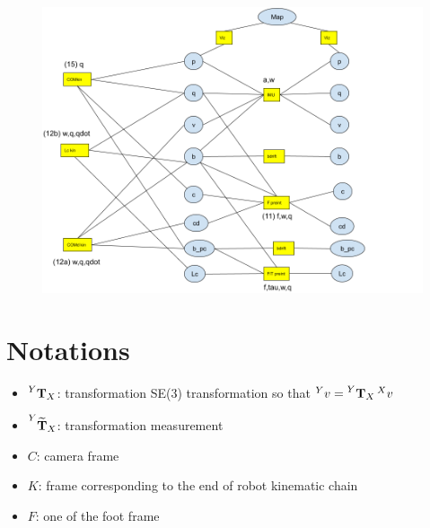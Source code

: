\documentclass[11pt]{article}
\newcommand{\T}[2]{\prescript{#1}{}{\bfT}_{#2}}
\newcommand{\Tm}[2]{\prescript{#1}{}{\widetilde{\bfT}}_{#2}}
\begin{document}
\begin{figure}[ht]
    \centering
    \includegraphics[width=1\linewidth]{HumanoidStateFactorGraph.png}
    \label{fig:my_label}
\end{figure}





\section{Notations}
\begin{itemize}
    \item $\T{Y}{X}$: transformation SE(3) transformation so that $\prescript{Y}{}{v}=\T{Y}{X}\prescript{X}{}{v}$
    \item $\Tm{Y}{X}$: transformation measurement
    \item $C$: camera frame
    \item $K$: frame corresponding to the end of robot kinematic chain 
    \item $F$: one of the foot frame 
\end{itemize}
\end{document}

